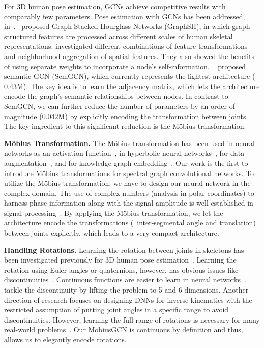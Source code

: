 \documentclass[runningheads]{llncs}
\begin{document}
For 3D human pose estimation, GCNs achieve competitive results with comparably few parameters. Pose estimation with GCNs has been addressed, \eg in~\cite{liu2020comprehensive, xu2021graph,zhaoCVPR19semantic}.~\citet{xu2021graph} proposed Graph Stacked Hourglass Networks (GraphSH), in which graph-structured features are processed across different scales of human skeletal representations. \citet{liu2020comprehensive} investigated different combinations of feature transformations and neighborhood aggregation of spatial features.
They also showed the benefits of using separate weights to incorporate a node's self-information.
~\citet{zhaoCVPR19semantic} proposed semantic GCN (SemGCN), which currently represents the lightest architecture ($0.43\text{M}$). The key idea is to learn the adjacency matrix, which lets the architecture encode the graph's semantic relationships between nodes. In contrast to SemGCN, we can further reduce the number of parameters by an order of magnitude ($0.042\text{M}$) by explicitly encoding the transformation between joints. The key ingredient to this significant reduction is the M\"obius transformation.

\textbf{M\"{o}bius Transformation.} The M\"{o}bius transformation has been used in neural networks as an activation function~\cite{ozdemir2011complex,mandic2009complex}, in hyperbolic neural networks~\cite{NEURIPS2018_dbab2adc}, for data augmentation~\cite{zhou2021data}, and for knowledge graph embedding~\cite{nayyeri20205}.
Our work is the first to introduce M\"{o}bius transformations for spectral graph convolutional networks.
To utilize the M\"{o}bius transformation, we have to design our neural network in the complex domain. The use of complex numbers (analysis in polar coordinates) to harness phase information along with the signal amplitude is well established in signal processing~\cite{mandic2009complex}. By applying the M\"obius transformation, we let the architecture encode the transformations (\ie~inter-segmental angle and translation) between joints explicitly, which leads to a very compact architecture.

\textbf{Handling Rotations.} Learning the rotation between joints in skeletons has been investigated previously for 3D human pose estimation~\cite{zhou2016deep,parameswaran2004view,barron2001estimating}. Learning the rotation using Euler angles or quaternions, however, has obvious issues like discontinuities~\cite{saxena2009learning, zhou2019continuity}. 
Continuous functions are easier to learn in neural networks~\cite{zhou2019continuity}.
~\citet{zhou2019continuity} tackle the discontinuity by lifting the problem to 5 and 6 dimensions. Another direction of research focuses on designing DNNs for inverse kinematics with the restricted assumption of putting joint angles in a specific range to avoid discontinuities. However, learning the full range of rotations is necessary for many real-world problems~\cite{zhou2019continuity}. 
Our M\"obiusGCN is continuous by definition and thus, allows us to elegantly encode rotations.
\end{document}
